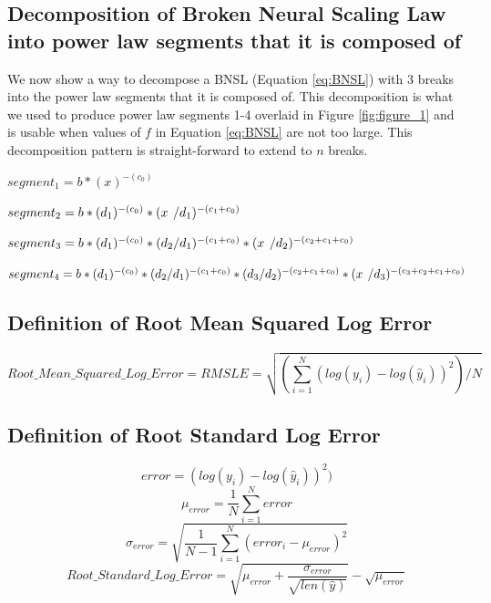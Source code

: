 \documentclass{article} %
\begin{document}

\subsection{Decomposition of Broken Neural Scaling Law into power law segments that it is composed of}
\label{section:decomposition_of_BNSL}

We now show a way to decompose a BNSL (Equation \ref{eq:BNSL}) with 3 breaks into the power law segments that it is composed of. This decomposition is what we used to produce power law segments 1-4 overlaid in Figure \ref{fig:figure_1} and is usable when values of $f$ in Equation \ref{eq:BNSL} are not too large. This decomposition pattern is straight-forward to extend to $n$ breaks.

$segment_1 = b * (x)^{-(c_0)}$

$segment_2 = b * (d_1)^{-(c_0)} * (x\hspace{.14cm}/d_1)^{-(c_1+c_0)}$

$segment_3 = b * (d_1)^{-(c_0)} * (d_2/d_1)^{-(c_1+c_0)} * (x\hspace{.14cm}/d_2)^{-(c_2+c_1+c_0)}$

$segment_4 = b * (d_1)^{-(c_0)} * (d_2/d_1)^{-(c_1+c_0)} * (d_3/d_2)^{-(c_2+c_1+c_0)} * (x\hspace{.14cm}/d_3)^{-(c_3+c_2+c_1+c_0)}$




\subsection{Definition of Root Mean Squared Log Error}
\label{section:definition_of_Root_Mean_Squared_Log_Error}

\[Root\_Mean\_Squared\_Log\_Error = RMSLE = \sqrt{(\sum_{i=1}^{N}(log(y_{i})-log(\hat{y}_{i}))^2)/N}\]

\subsection{Definition of Root Standard Log Error}
\label{section:definition_of_Root_Standard_Log_Error}

\[error = (log(y_{i})-log(\hat{y}_{i}))^2)\] 
\[\mu_{error} = \frac{1}{N}\sum_{i=1}^N error\]
\[\sigma_{error} = \sqrt{\frac{1}{N-1}\sum_{i=1}^N(error_i-\mu_{error})^2}\]
\[Root\_Standard\_Log\_Error = \sqrt{\mu_{error} + \frac{\sigma_{error}}{\sqrt{len(\hat{y})}}} - \sqrt{\mu_{error}}\] 
\end{document}
